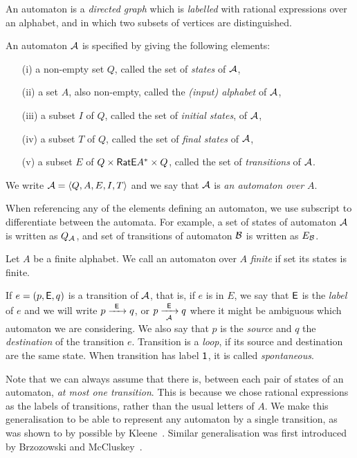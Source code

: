 An automaton is a \emph{directed graph} which is \emph{labelled} with rational expressions over an alphabet, and in which two subsets of vertices are distinguished.

\begin{defn}
    An automaton ${\mathcal{A}}$ is specified by giving the following elements:
    \begin{itemize}
        \item[(i)] a non-empty set $Q$, called the set of \emph{states} of ${\mathcal{A}}$,
        \item[(ii)] a set $A$, also non-empty, called the \emph{(input) alphabet} of ${\mathcal{A}}$,
        \item[(iii)] a subset $I$ of $Q$, called the set of \emph{initial states}, of ${\mathcal{A}}$,
        \item[(iv)] a subset $T$ of $Q$, called the set of \emph{final states} of ${\mathcal{A}}$,
        \item[(v)] a subset $E$ of $Q \times {\mathsf{RatE}} A^* \times Q$, called the set of \emph{transitions} of ${\mathcal{A}}$.
    \end{itemize}
    We write ${\mathcal{A}} = \langle Q, A, E, I, T \rangle$ and we say that ${\mathcal{A}}$ is \emph{an automaton over $A$}.
\end{defn}

When referencing any of the elements defining an automaton, we use subscript to differentiate between the automata. For example, a set of states of automaton ${\mathcal{A}}$ is written as $Q_{{\mathcal{A}}}$, and set of transitions of automaton ${\mathcal{B}}$ is written as $E_{{\mathcal{B}}}$.

Let $A$ be a finite alphabet. We call an automaton over $A$ \emph{finite} if set its states is finite.

If $e = (p, {\mathsf{E}}, q)$ is a transition of ${\mathcal{A}}$, that is, if $e$ is in $E$, we say that ${\mathsf{E}}$ is the \emph{label} of $e$ and we will write $p {\; \xrightarrow[]{\: \; {\mathsf{E}} \: \;} \;} q$, or $p {\; \xrightarrow[{\mathcal{A}}]{\: \; {\mathsf{E}} \: \;} \;} q$ where it might be ambiguous which automaton we are considering. We also say that $p$ is the \emph{source} and $q$ the \emph{destination} of the transition $e$. Transition is a \emph{loop}, if its source and destination are the same state. When transition has label ${\mathsf{1}}$, it is called \emph{spontaneous}.

Note that we can always assume that there is, between each pair of states of an automaton, \emph{at most one transition}. This is because we chose rational expressions as the labels of transitions, rather than the usual letters of $A$. We make this generalisation to be able to represent any automaton by a single transition, as was shown to by possible by Kleene~\cite{Kleene56}. Similar generalisation was first introduced by Brzozowski and McCluskey~\cite{BrzozowskiMcCluskey64}.

